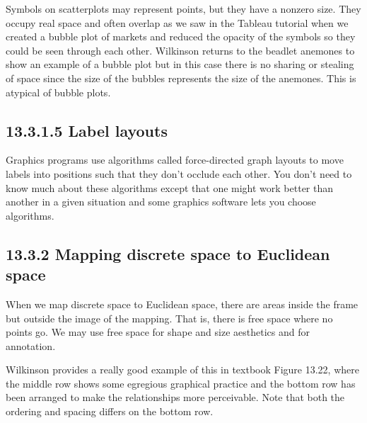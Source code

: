 Symbols on scatterplots may represent points, but they have a nonzero
size. They occupy real space and often overlap as we saw in the Tableau
tutorial when we created a bubble plot of markets and reduced the
opacity of the symbols so they could be seen through each other.
Wilkinson returns to the beadlet anemones to show an example of a bubble
plot but in this case there is no sharing or stealing of space since the
size of the bubbles represents the size of the anemones. This is
atypical of bubble plots.

\hypertarget{label-layouts}{%
\subsection{13.3.1.5 Label layouts}\label{label-layouts}}

Graphics programs use algorithms called force-directed graph layouts to
move labels into positions such that they don't occlude each other. You
don't need to know much about these algorithms except that one might
work better than another in a given situation and some graphics software
lets you choose algorithms.

\hypertarget{mapping-discrete-space-to-euclidean-space}{%
\subsection{13.3.2 Mapping discrete space to Euclidean
space}\label{mapping-discrete-space-to-euclidean-space}}

When we map discrete space to Euclidean space, there are areas inside
the frame but outside the image of the mapping. That is, there is free
space where no points go. We may use free space for shape and size
aesthetics and for annotation.

Wilkinson provides a really good example of this in textbook Figure
13.22, where the middle row shows some egregious graphical practice and
the bottom row has been arranged to make the relationships more
perceivable. Note that both the ordering and spacing differs on the
bottom row.

